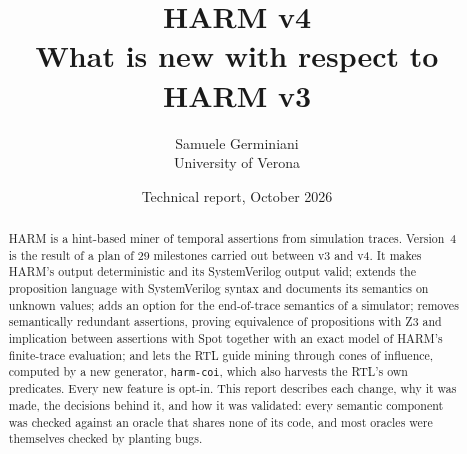 \documentclass[11pt,a4paper]{article}
\title{\textbf{HARM v4}\\[4pt]\large What is new with respect to HARM v3}
\author{Samuele Germiniani\\University of Verona}
\date{Technical report, October 2026}
\begin{document}
\maketitle

\begin{abstract}
HARM is a hint-based miner of temporal assertions from simulation traces. Version~4 is the result of a plan of 29 milestones carried out between v3 and v4. It makes HARM's output deterministic and its SystemVerilog output valid; extends the proposition language with SystemVerilog syntax and documents its semantics on unknown values; adds an option for the end-of-trace semantics of a simulator; removes semantically redundant assertions, proving equivalence of propositions with Z3 and implication between assertions with Spot together with an exact model of HARM's finite-trace evaluation; and lets the RTL guide mining through cones of influence, computed by a new generator, \texttt{harm-coi}, which also harvests the RTL's own predicates. Every new feature is opt-in. This report describes each change, why it was made, the decisions behind it, and how it was validated: every semantic component was checked against an oracle that shares none of its code, and most oracles were themselves checked by planting bugs.
\end{abstract}

\tableofcontents
\newpage











\appendix




\end{document}
